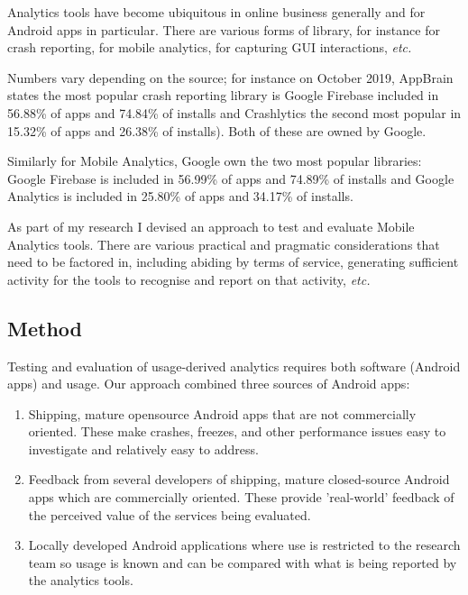 Analytics tools have become ubiquitous in online business generally and for Android apps in particular. There are various forms of library, for instance for crash reporting, for mobile analytics, for capturing GUI interactions, \emph{etc.}

Numbers vary depending on the source; for instance on  October 2019, AppBrain states the most popular crash reporting library is Google Firebase included in 56.88\% of apps and 74.84\% of installs and Crashlytics the second most popular in 15.32\% of apps and 26.38\% of installs)\cite{appbrain_android_crash_reporting_libraries_18_oct_2019}. Both of these are owned by Google.

Similarly for Mobile Analytics, Google own the two most popular libraries: Google Firebase is included in 56.99\% of apps and 74.89\% of installs and Google Analytics is included in 25.80\% of apps and 34.17\% of installs.

As part of my research I devised an approach to test and evaluate Mobile Analytics tools. There are various practical and pragmatic considerations that need to be factored in, including abiding by terms of service, generating sufficient activity for the tools to recognise and report on that activity, \emph{etc.}


\subsection{Method}
Testing and evaluation of usage-derived analytics requires both software (Android apps) and usage. Our approach combined three sources of Android apps:

\begin{enumerate}
    \item Shipping, mature opensource Android apps that are not commercially oriented. These make crashes, freezes, and other performance issues easy to investigate and relatively easy to address.
    \item Feedback from several developers of shipping, mature closed-source Android apps which are commercially oriented. These provide 'real-world' feedback of the perceived value of the services being evaluated.
    \item Locally developed Android applications where use is restricted to the research team so usage is known and can be compared with what is being reported by the analytics tools. 
\end{enumerate}

